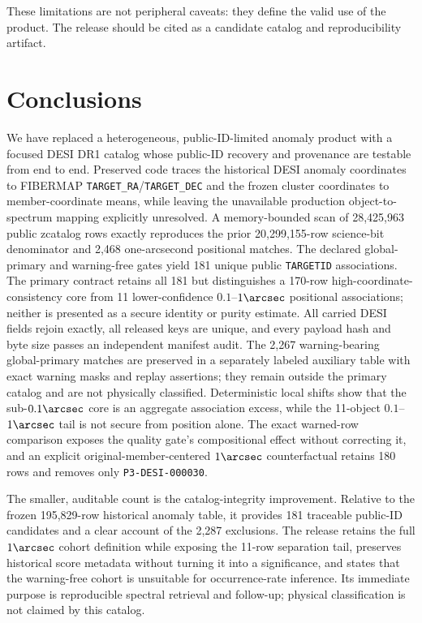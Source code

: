 \documentclass[twocolumn]{aastex701}
\begin{document}
These limitations are not peripheral caveats: they define the valid use of the product.  The
release should be cited as a candidate catalog and reproducibility artifact.

\section{Conclusions}\label{sec:conclusions}

We have replaced a heterogeneous, public-ID-limited anomaly product with a focused DESI DR1
catalog whose public-ID recovery and provenance are testable from end to end.  Preserved code traces
the historical DESI anomaly coordinates to FIBERMAP \texttt{TARGET\_RA}/\texttt{TARGET\_DEC} and
the frozen cluster coordinates to member-coordinate means, while leaving the unavailable production
object-to-spectrum mapping explicitly unresolved.  A memory-bounded scan of
28,425,963 public zcatalog rows exactly reproduces the prior 20,299,155-row science-bit denominator
and 2,468 one-arcsecond positional matches.  The declared global-primary and warning-free gates
yield 181 unique public \texttt{TARGETID} associations.  The primary contract retains all 181 but
distinguishes a 170-row high-coordinate-consistency core from 11 lower-confidence $0.1$--$1\arcsec$
positional associations; neither is presented as a secure identity or purity estimate.  All carried
DESI fields rejoin exactly, all released
keys are unique, and every payload hash and byte size passes an independent manifest audit.
The 2,267 warning-bearing global-primary matches are preserved in a separately labeled auxiliary
table with exact warning masks and replay assertions; they remain outside the primary catalog and
are not physically classified.
Deterministic local shifts show that the sub-$0.1\arcsec$ core is an aggregate association excess,
while the 11-object $0.1$--$1\arcsec$ tail is not secure from position alone.  The exact warned-row
comparison exposes the quality gate's compositional effect without correcting it, and an explicit
original-member-centered $1\arcsec$ counterfactual retains 180 rows and removes only
\texttt{P3-DESI-000030}.

The smaller, auditable count is the catalog-integrity improvement.  Relative to the frozen
195,829-row historical anomaly table, it provides 181 traceable public-ID candidates and a clear account
of the 2,287 exclusions.  The release retains the full $1\arcsec$ cohort definition while exposing
the 11-row separation tail, preserves historical score metadata without turning it into a
significance, and states that the warning-free cohort is unsuitable for occurrence-rate
inference.  Its immediate purpose is reproducible spectral retrieval and follow-up; physical
classification is not claimed by this catalog.
\end{document}
